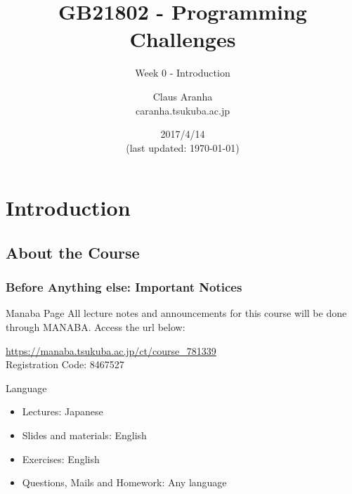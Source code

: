 \documentclass{beamer}
\title[GB21802]{GB21802 - Programming Challenges}
\subtitle[]{Week 0 - Introduction}
\author[Claus Aranha]{Claus Aranha\\{\footnotesize caranha\@@cs.tsukuba.ac.jp}}
\institute{Department of Computer Science}
\date{2017/4/14\\{\smaller(last updated: \today)}}
\begin{document}
\section{Introduction}
\subsection{About the Course}

\begin{frame}
\maketitle
\end{frame}


\begin{frame}
  \frametitle{Before Anything else: Important Notices}

  \begin{block}{Manaba Page}
    All lecture notes and announcements for this course will be done
    through MANABA. Access the url below:
    
    \medskip
    
    \url{https://manaba.tsukuba.ac.jp/ct/course_781339}\\
    Registration Code: 8467527
  \end{block}
  \begin{exampleblock}{Language}
    \begin{itemize}
      \item Lectures: Japanese
      \item Slides and materials: English
      \item Exercises: English
      \item Questions, Mails and Homework: Any language
    \end{itemize}
  \end{exampleblock}
\end{frame}
\end{document}
